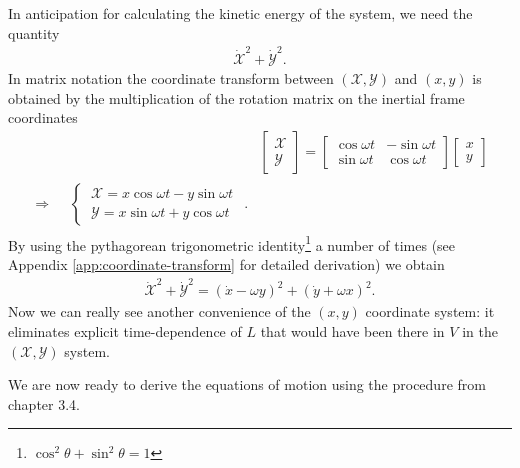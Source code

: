 In anticipation for calculating the kinetic energy of the system, we need the quantity
\begin{align}
\dot{\mathscr{X}}^2 + \dot{\mathscr{Y}}^2.
\end{align}
In matrix notation the coordinate transform between $(\mathscr{X},\mathscr{Y})$ and $(x,y)$ is obtained by the multiplication of the rotation matrix on the inertial frame coordinates
\begin{align}
\nonumber &\begin{bmatrix}
  \mathscr{X} \\
  \mathscr{Y}
\end{bmatrix}
=
\begin{bmatrix}
  \cos{\omega t} & -\sin{\omega t} \\
  \sin{\omega t} & \cos{\omega t}
\end{bmatrix}
\begin{bmatrix}
  x \\
  y
\end{bmatrix} \\[0.2cm]
\label{eq:coordinate-transform}
\Rightarrow
\begin{split}
&\begin{cases}
\ \mathscr{X} = x\cos{\omega t} - y\sin{\omega t} \\
\ \mathscr{Y} = x\sin{\omega t} + y\cos{\omega t}
\end{cases}
\end{split}.
\end{align}
By using the pythagorean trigonometric identity\footnote{$\cos^2{\theta} + \sin^2{\theta} = 1$} a number of times (see Appendix \ref{app:coordinate-transform} for detailed derivation) we obtain
\begin{align}
\mathscr{\dot{\mathscr{X}}}^2 + \mathscr{\dot{\mathscr{Y}}}^2 = (\dot{x}-\omega y)^2 + (\dot{y}+\omega x)^2.
\end{align}
Now we can really see another convenience of the $(x,y)$ coordinate system: it eliminates explicit time-dependence of $L$ that would have been there in $V$ in the $(\mathscr{X},\mathscr{Y})$ system.

We are now ready to derive the equations of motion using the procedure from chapter 3.4.
